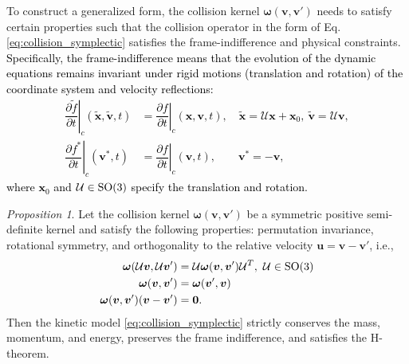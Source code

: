 \documentclass[preprint,1p,times]{elsarticle}
\theoremstyle{definition}
\theoremstyle{remark}
\newtheorem{proposition}{Proposition}
\newcommand{\tcr}[1]{\textcolor{black}{#1}}
\begin{document}
To construct a generalized form, the collision kernel $\boldsymbol{\omega}(\boldsymbol{v}, \boldsymbol{v}')$ needs to satisfy certain properties such that the collision operator in the form of Eq. \eqref{eq:collision_symplectic} satisfies the frame-indifference and physical constraints. \tcr{Specifically, 
the frame-indifference means that the evolution of the dynamic equations remains invariant under rigid motions (translation and rotation) of the coordinate system and velocity reflections:
\begin{equation*}
    \begin{aligned}
        \left.\dfrac{\partial \tilde{f}}{\partial t}\right|_{c} (\tilde{\boldsymbol{x}},\tilde{\boldsymbol{v}},t) &= \left.\dfrac{\partial f}{\partial t}\right|_{c} (\boldsymbol{x},\boldsymbol{v},t), \quad \tilde{\boldsymbol{x}} = \mathcal{U}\boldsymbol{x} + \boldsymbol{x}_{0}, ~ \tilde{\boldsymbol{v}} = \mathcal{U}\boldsymbol{v}, \\
        \left.\dfrac{\partial f^*}{\partial t}\right|_{c} (\boldsymbol{v}^*,t) &= \left.\dfrac{\partial f}{\partial t}\right|_{c} (\boldsymbol{v},t), \quad\quad \boldsymbol{v}^* = -\boldsymbol{v},
    \end{aligned}
\end{equation*}
where $\boldsymbol{x}_0$ and $\mathcal{U} \in {\rm SO}(3)$ specify the translation and rotation.} 



\begin{proposition}
\label{prop:kernel_condition}
Let the collision kernel $\boldsymbol{\omega}(\boldsymbol{v},\boldsymbol{v}')$ be a symmetric positive semi-definite kernel and satisfy the following properties: permutation invariance, rotational symmetry, and orthogonality to the relative velocity $\boldsymbol{u} = \boldsymbol{v} - \boldsymbol{v}'$, i.e., 
\begin{equation}\label{eq:kernel_conditions}
    \begin{aligned}
        \boldsymbol{\omega}(\mathcal{U}\boldsymbol{v},\mathcal{U}\boldsymbol{v}') &= \mathcal{U}\boldsymbol{\omega}(\boldsymbol{v},\boldsymbol{v}')\mathcal{U}^T,~  \mathcal{U} \in {\rm SO}(3)\\
        \boldsymbol{\omega}(\boldsymbol{v},\boldsymbol{v}') &= \boldsymbol{\omega}(\boldsymbol{v}',\boldsymbol{v}) \\
        \boldsymbol{\omega}(\boldsymbol{v},\boldsymbol{v}')(\boldsymbol{v} -\boldsymbol{v}') &= \boldsymbol{0} .
    \end{aligned}
\end{equation}
Then the kinetic model \eqref{eq:collision_symplectic} strictly conserves the mass, momentum, and energy, preserves the frame indifference, and satisfies the H-theorem.     
\end{proposition}
\end{document}
